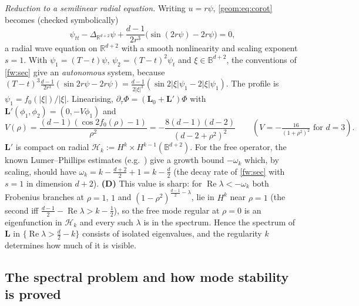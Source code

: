 \emph{Reduction to a semilinear radial equation.} Writing $u=r\psi$,
\eqref{geom:eq:corot} becomes (checked symbolically)
\begin{equation}\label{geom:eq:psi}
  \psi_{tt}-\Delta_{\mathbb{R}^{d+2}}\psi
  +\frac{d-1}{2r^3}\bigl(\sin(2r\psi)-2r\psi\bigr)=0,
\end{equation}
a radial wave equation on $\mathbb{R}^{d+2}$ with a smooth nonlinearity and
scaling exponent $s=1$. With $\psi_1=(T-t)\psi$, $\psi_2=(T-t)^2\psi_t$ and
$\xi\in\mathbb{B}^{d+2}$, the conventions of \cref{fw:sec} give an
\emph{autonomous} system, because
$(T-t)^3\frac{d-1}{2r^3}(\sin 2r\psi-2r\psi)
=\frac{d-1}{2|\xi|^3}(\sin 2|\xi|\psi_1-2|\xi|\psi_1)$.
The profile is $\psi_1=f_0(|\xi|)/|\xi|$. Linearising,
$\partial_\tau\Phi=(\mathbf L_0+\mathbf L')\Phi$ with
$\mathbf L'(\phi_1,\phi_2)=(0,-V\phi_1)$ and
\begin{equation}\label{geom:eq:V}
  V(\rho)=\frac{(d-1)(\cos 2f_0(\rho)-1)}{\rho^2}
         =-\frac{8(d-1)(d-2)}{(d-2+\rho^2)^2}\qquad(V=-\tfrac{16}{(1+\rho^2)^2}\text{ for }d=3).
\end{equation}
$\mathbf L'$ is compact on radial $\mathcal H_k:=H^k\times H^{k-1}(\mathbb{B}^{d+2})$.
For the free operator, the known Lumer--Phillips estimates (e.g.\
\cite{Donninger2011,ChatzikaleasDonningerGlogic2017,Glogic2025}) give a
growth bound $-\omega_k$ which, by scaling, should have
$\omega_k=k-\frac{d+2}{2}+1=k-\frac d2$ (the decay rate of \cref{fw:sec} with $s=1$
in dimension $d+2$).
\textbf{(D)} This value is sharp: for $\operatorname{Re}\lambda<-\omega_k$ both Frobenius branches at $\rho=1$,
$1$ and $(1-\rho^2)^{\frac{d-1}{2}-\lambda}$, lie in $H^k$ near $\rho=1$
(the second iff $\frac{d-1}{2}-\operatorname{Re}\lambda>k-\frac12$), so the
free mode regular at $\rho=0$ is an eigenfunction in $\mathcal H_k$ and every such
$\lambda$ is in the spectrum. Hence the spectrum of
$\mathbf L$ in $\{\operatorname{Re}\lambda>\frac d2-k\}$ consists of isolated
eigenvalues, and the regularity $k$ determines how much of it is visible.

\subsection{The spectral problem and how mode stability is proved}
\label{geom:sec:wm-spec}

